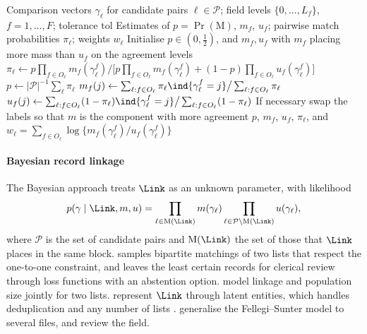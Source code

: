 \begin{algorithm}[t]
\caption{Fellegi--Sunter EM under conditional independence}\label{alg:fsem}
\begin{algorithmic}[1]
\Require Comparison vectors $\gamma_\ell$ for candidate pairs $\ell\in\mathcal P$; field levels $\{0,\dots,L_f\}$, $f=1,\dots,F$; tolerance $\mathrm{tol}$
\Ensure Estimates of $p=\Pr(\mathrm M)$, $m_f$, $u_f$; pairwise match probabilities $\pi_\ell$; weights $w_\ell$
\State Initialise $p\in(0,\tfrac12)$, and $m_f,u_f$ with $m_f$ placing more mass than $u_f$ on the agreement levels
\Repeat
   
    \State $\pi_\ell\gets p\prod_{f\in O_\ell}m_f(\gamma^f_\ell)\big/\bigl[p\prod_{f\in O_\ell}m_f(\gamma^f_\ell)+(1-p)\prod_{f\in O_\ell}u_f(\gamma^f_\ell)\bigr]$
  \EndFor
  \State $p\gets|\mathcal P|^{-1}\sum_\ell\pi_\ell$ 
    \State $m_f(j)\gets\sum_{\ell:f\in O_\ell}\pi_\ell\ind{\gamma^f_\ell=j}\big/\sum_{\ell:f\in O_\ell}\pi_\ell$
    \State $u_f(j)\gets\sum_{\ell:f\in O_\ell}(1-\pi_\ell)\ind{\gamma^f_\ell=j}\big/\sum_{\ell:f\in O_\ell}(1-\pi_\ell)$
  \EndFor
{}
\State If necessary swap the labels so that $m$ is the component with more agreement
\State \Return $p$, $m_f$, $u_f$, $\pi_\ell$, and $w_\ell=\sum_{f\in O_\ell}\log\{m_f(\gamma_\ell^f)/u_f(\gamma_\ell^f)\}$
\end{algorithmic}
\end{algorithm}

\paragraph{Bayesian record linkage}
The Bayesian approach treats $\Link$ as an unknown parameter, with likelihood
\begin{equation}\label{eq:link-fslik}
  p(\gamma\mid\Link,m,u)=\prod_{\ell\in\mathrm M(\Link)}m(\gamma_\ell)\prod_{\ell\in\mathcal P\setminus\mathrm M(\Link)}u(\gamma_\ell),
\end{equation}
where $\mathcal P$ is the set of candidate pairs and $\mathrm M(\Link)$ the set of those that $\Link$ places in the same block.  samples bipartite matchings of two lists that respect the one-to-one constraint, and leaves the least certain records for clerical review through loss functions with an abstention option.  model linkage and population size jointly for two lists.  represent $\Link$ through latent entities, which handles deduplication and any number of lists \citep[see also][]{marchant2021,tancredi2020}.  generalise the Fellegi--Sunter model to several files, and \citet{binette2022} review the field.

